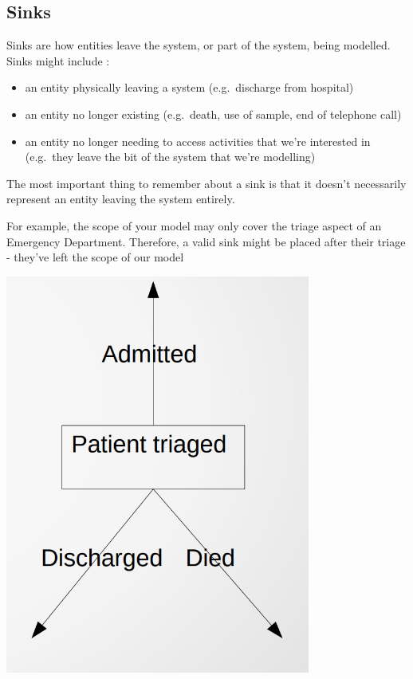 \documentclass[
  letterpaper,
  DIV=11,
  numbers=noendperiod]{scrreprt}
\providecommand{\tightlist}{%
  \setlength{\itemsep}{0pt}\setlength{\parskip}{0pt}}\usepackage{longtable,booktabs,array}
\begin{document}
\subsection{Sinks}\label{sinks}

Sinks are how entities leave the system, or part of the system, being
modelled. Sinks might include :

\begin{itemize}
\tightlist
\item
  an entity physically leaving a system (e.g.~discharge from hospital)
\item
  an entity no longer existing (e.g.~death, use of sample, end of
  telephone call)
\item
  an entity no longer needing to access activities that we're interested
  in (e.g.~they leave the bit of the system that we're modelling)
\end{itemize}

The most important thing to remember about a sink is that it doesn't
necessarily represent an entity leaving the system entirely.

For example, the scope of your model may only cover the triage aspect of
an Emergency Department. Therefore, a valid sink might be placed after
their triage - they've left the scope of our model

\includegraphics{images/sinks_simple.png}
\end{document}
